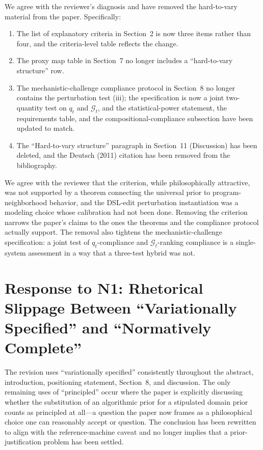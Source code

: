 \documentclass[11pt]{article}
\begin{document}
We agree with the reviewer's diagnosis and have removed the hard-to-vary material from the paper. Specifically:
\begin{enumerate}
\item The list of explanatory criteria in Section~2 is now three items rather than four, and the criteria-level table reflects the change.
\item The proxy map table in Section~7 no longer includes a ``hard-to-vary structure'' row.
\item The mechanistic-challenge compliance protocol in Section~8 no longer contains the perturbation test (iii); the specification is now a joint two-quantity test on $q_t$ and $\mathcal{G}_t$, and the statistical-power statement, the requirements table, and the compositional-compliance subsection have been updated to match.
\item The ``Hard-to-vary structure'' paragraph in Section~11 (Discussion) has been deleted, and the Deutsch (2011) citation has been removed from the bibliography.
\end{enumerate}

We agree with the reviewer that the criterion, while philosophically attractive, was not supported by a theorem connecting the universal prior to program-neighborhood behavior, and the DSL-edit perturbation instantiation was a modeling choice whose calibration had not been done. Removing the criterion narrows the paper's claims to the ones the theorems and the compliance protocol actually support. The removal also tightens the mechanistic-challenge specification: a joint test of $q_t$-compliance and $\mathcal{G}_t$-ranking compliance is a single-system assessment in a way that a three-test hybrid was not.

\section*{Response to N1: Rhetorical Slippage Between ``Variationally Specified'' and ``Normatively Complete''}

The revision uses ``variationally specified'' consistently throughout the abstract, introduction, positioning statement, Section~8, and discussion. The only remaining uses of ``principled'' occur where the paper is explicitly discussing whether the substitution of an algorithmic prior for a stipulated domain prior counts as principled at all---a question the paper now frames as a philosophical choice one can reasonably accept or question. The conclusion has been rewritten to align with the reference-machine caveat and no longer implies that a prior-justification problem has been settled.
\end{document}
